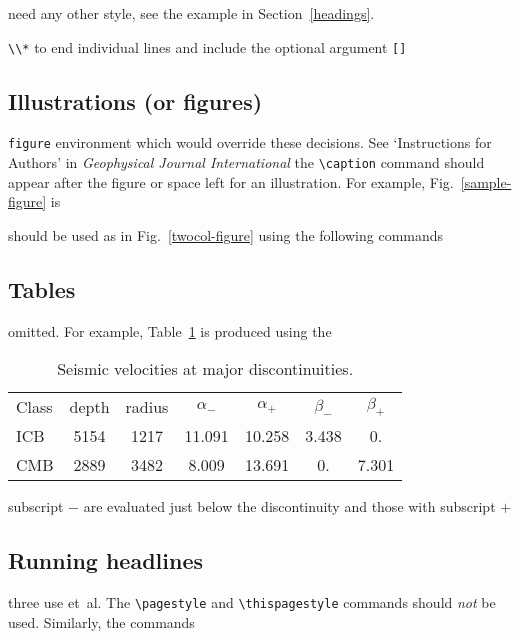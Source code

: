 need any other style, see the example in Section~\ref{headings}.

\verb"\\*" to end individual lines and include the optional argument \verb"[]" 

\subsection{Illustrations (or figures)}

\begin{figure*}
 \vspace{5.5cm}
  \caption{An example space has been left for the artwork.}\label{twocol-figure}
\end{figure*}

\verb"figure" environment which would override these decisions. See
`Instructions for Authors' in {\em Geophysical Journal International\/}
the \verb"\caption" command should appear after the figure or space
left for an illustration. For example, Fig.~\ref{sample-figure} is

should be used as in  Fig.~\ref{twocol-figure} using the following commands

\subsection{Tables}

omitted. For example, Table~\ref{symbols} is produced using the
\begin{table}
 \caption{Seismic velocities at major discontinuities.}\label{symbols}
 \begin{tabular}{@{}lcccccc}
  Class & depth & radius
        & $\alpha _{-}$ & $\alpha _{+}$
        & $\beta _{-}$ & $\beta _{+}$ \\
  ICB & 5154 & 1217 & 11.091 & 10.258
        & 3.438 &  0. \\
  CMB & 2889 & 3482 & 8.009 & 13.691
        & 0. & 7.301 \\
 \end{tabular}

 \medskip
subscript $-$ are evaluated just below the discontinuity and those with subscript $+$
\end{table}


\subsection{Running headlines}

three use et~al. The \verb"\pagestyle" and \verb"\thispagestyle"
commands should {\em not\/} be used. Similarly, the commands

